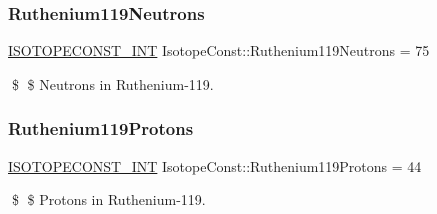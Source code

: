 \subsubsection{\texorpdfstring{Ruthenium119\+Neutrons}{Ruthenium119Neutrons}}
{\footnotesize\ttfamily \mbox{\hyperlink{group___isotope_const-_macros_ga5f18360b3e99483a35c32d789e62621c}{I\+S\+O\+T\+O\+P\+E\+C\+O\+N\+S\+T\+\_\+\+I\+NT}} Isotope\+Const\+::\+Ruthenium119\+Neutrons = 75}

\$ \$ Neutrons in Ruthenium-\/119. \mbox{\label{group___isotope_const-_ruthenium-_ru119_ga6c4bb276fa00f807976b3642e6318898}} 
\subsubsection{\texorpdfstring{Ruthenium119\+Protons}{Ruthenium119Protons}}
{\footnotesize\ttfamily \mbox{\hyperlink{group___isotope_const-_macros_ga5f18360b3e99483a35c32d789e62621c}{I\+S\+O\+T\+O\+P\+E\+C\+O\+N\+S\+T\+\_\+\+I\+NT}} Isotope\+Const\+::\+Ruthenium119\+Protons = 44}

\$ \$ Protons in Ruthenium-\/119. 